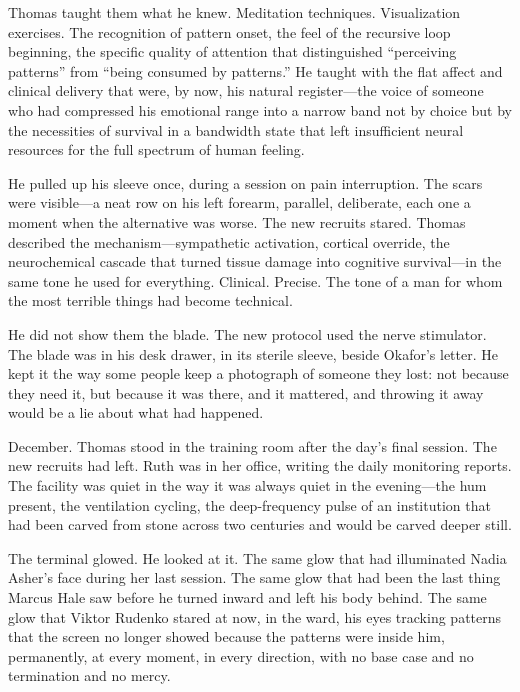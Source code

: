 Thomas taught them what he knew. Meditation techniques. Visualization exercises. The recognition of pattern onset, the feel of the recursive loop beginning, the specific quality of attention that distinguished ``perceiving patterns'' from ``being consumed by patterns.'' He taught with the flat affect and clinical delivery that were, by now, his natural register---the voice of someone who had compressed his emotional range into a narrow band not by choice but by the necessities of survival in a bandwidth state that left insufficient neural resources for the full spectrum of human feeling.

He pulled up his sleeve once, during a session on pain interruption. The scars were visible---a neat row on his left forearm, parallel, deliberate, each one a moment when the alternative was worse. The new recruits stared. Thomas described the mechanism---sympathetic activation, cortical override, the neurochemical cascade that turned tissue damage into cognitive survival---in the same tone he used for everything. Clinical. Precise. The tone of a man for whom the most terrible things had become technical.

He did not show them the blade. The new protocol used the nerve stimulator. The blade was in his desk drawer, in its sterile sleeve, beside Okafor's letter. He kept it the way some people keep a photograph of someone they lost: not because they need it, but because it was there, and it mattered, and throwing it away would be a lie about what had happened.

\scenebreak

December. Thomas stood in the training room after the day's final session. The new recruits had left. Ruth was in her office, writing the daily monitoring reports. The facility was quiet in the way it was always quiet in the evening---the hum present, the ventilation cycling, the deep-frequency pulse of an institution that had been carved from stone across two centuries and would be carved deeper still.

The terminal glowed. He looked at it. The same glow that had illuminated Nadia Asher's face during her last session. The same glow that had been the last thing Marcus Hale saw before he turned inward and left his body behind. The same glow that Viktor Rudenko stared at now, in the ward, his eyes tracking patterns that the screen no longer showed because the patterns were inside him, permanently, at every moment, in every direction, with no base case and no termination and no mercy.

